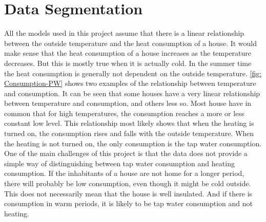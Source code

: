 \section{Data Segmentation}
All the models used in this project assume that there is a linear relationship between the outside temperature and the heat consumption of a house. It would make sense that the heat consumption of a house increases as the temperature decreases. But this is mostly true when it is actually cold. In the summer time the heat consumption is generally not dependent on the outside temperature. \cref{fig: Consumption-PW} shows two examples of the relationship between temperature and consumption. It can be seen that some houses have a very linear relationship between temperature and consumption, and others less so. Most house have in common that for high temperatures, the consumption reaches a more or less constant low level. This relationship most likely shows that when the heating is turned on, the consumption rises and falls with the outside temperature. When the heating is not turned on, the only consumption is the tap water consumption. One of the main challenges of this project is that the data does not provide a simple way of distinguishing between tap water consumption and heating consumption. If the inhabitants of a house are not home for a longer period, there will probably be low consumption, even though it might be cold outside. This does not necessarily mean that the house is well insulated. And if
there is consumption in warm periods, it is likely to be tap water consumption and not heating.


